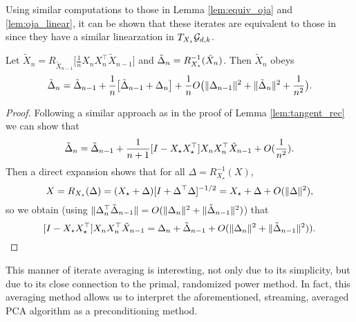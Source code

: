 Using similar computations to those in Lemma \ref{lem:equiv_oja} and \ref{lem:oja_linear}, it can be shown that these iterates are equivalent to those in  since they have a similar linearzation in $T_{X_\star}\mathcal{G}_{d,k}$.
\begin{lemma}\label{lem:average_oja}
 Let $\tilde X_n=R_{\tilde X_{n-1}}\Big[\frac{1}{n}X_nX_n^\top \tilde X_{n-1}\Big]$ and $\tilde {\Delta}_n=R_{X_\star}^{-1}(\tilde X_n)$. Then $\tilde X_n$ obeys
\[
\tilde {\Delta}_n=\tilde {\Delta}_{n-1}+\frac{1}{n}\big[\tilde {\Delta}_{n-1}+ \Delta_{n} \big]+ \frac{1}{n}O\big( \Vert \Delta_{n-1}\Vert^2+\Vert \tilde{\Delta}_{n}\Vert^2 + \frac{1}{n^2}\big).
\]
\end{lemma}
\begin{proof}
Following a similar approach as in the proof of Lemma \ref{lem:tangent_rec} we can show that
\[
\tilde {\Delta}_n=\tilde {\Delta}_{n-1}+\frac{1}{n+1}[I-X_\star X_\star^\top]X_nX_n^\top \tilde X_{n-1}+O(\frac{1}{n^2}).
\]
Then a direct expansion shows that for all $\Delta = R^{-1}_{X_\star}(X)$,
\[
X=R_{X_\star}(\Delta)=(X_\star+\Delta)[I+\Delta^\top\Delta]^{-1/2}=X_\star+\Delta+O(\Vert\Delta\Vert^2),
\]
so we obtain (using $\Vert\Delta_n^\top \tilde{\Delta}_{n-1}\Vert=O(\Vert\Delta_n\Vert^2+\Vert \tilde {\Delta}_{n-1}\Vert^2)$) that
\[
[I-X_\star X_\star^\top]X_nX_n^\top \tilde X_{n-1}=\Delta_n+\tilde {\Delta}_{n-1}+O(\Vert\Delta_n\Vert^2+\Vert \tilde {\Delta}_{n-1}\Vert^2)).
\]
\end{proof}
This manner of iterate averaging is interesting, not only due to its simplicity, but due to its close connection to the primal, randomized power method. In fact, this averaging method allows us
to interpret the aforementioned, streaming, averaged PCA algorithm as a preconditioning method.

